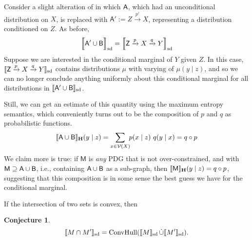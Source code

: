 \documentclass{article}
\theoremstyle{plain}
\newtheorem{conj}[theorem]{Conjecture}
\theoremstyle{definition}
\newenvironment{example}
	{\pushQED{\qed}\renewcommand{\qedsymbol}{$\triangle$}\examplex}
	{\popQED\endexamplex%
}
\theoremstyle{remark}
\DeclarePairedDelimiter{\bbr}{\llbracket}{\rrbracket}
\DeclarePairedDelimiter{\SD}{\llbracket}{\rrbracket_{\text{sd}}}
\newcommand\MaxEnt{_{\mathbf H}}
\newcommand{\V}{\mathcal V}
\newcommand{\sfM}{\mathsf M}
\numberwithin{equation}{section}
\begin{document}
\begin{vfull}
	\begin{example}[composition]
		Consider a slight alteration of  in which $\sf A$, which had an unconditional distribution on $X$, is replaced with $\mathsf A' := Z \xrightarrow{p'} X$, representing a distribution conditioned on $Z$. 
		As before,
		\[ \SD[\Big]{{\sf A' \cup B}} = \SD[\Big]{{\mathsf Z} \xrightarrow{p} X \xrightarrow{q} Y} \]
		Suppose we are interested in the conditional marginal of $Y$ given $Z$. In this case, $\SD{{\mathsf Z} \xrightarrow{p} X \xrightarrow{q} Y} $ contains distributions $\mu$ with varying of $\mu(y \mid z)$, and so we can no longer conclude anything uniformly about this conditional marginal for all distributions in $\SD{{\sf A' \cup B}}$. 
		
		Still, we can get an estimate of this quantity using the maximum entropy semantics, which conveniently turns out to be the composition of $p$ and $q$ as probabilistic functions.
		$$ \bbr{{\sf A \cup B}}\MaxEnt(y \mid z) = \sum_{x \in \V(X)}\!\! p (x \mid z)\ q(y \mid x) = q \circ p $$
		We claim more is true: if $\sfM$ is \emph{any} PDG that is not over-constrained, and with $\sfM \supseteq \sf A \cup B$, i.e., containing $\sf A \cup B$ as a sub-graph, then
		$ \bbr{\sfM}\MaxEnt(y \mid z) = q \circ p$,
		suggesting that this composition is in some sense the best guess we have for the conditional marginal. 
	\end{example}

	\begin{vleftovers}
	If the intersection of two sets is convex, then 
	\begin{conj}\label{prop:intersect-set-semantics}
		\[ \SD{M \cap M'} = \text{ConvHull}(\SD{M} \mathop{\dot\cup} \SD{M'}).\]
	\end{conj}
	\end{vleftovers}
\end{vfull}
	
\end{document}

